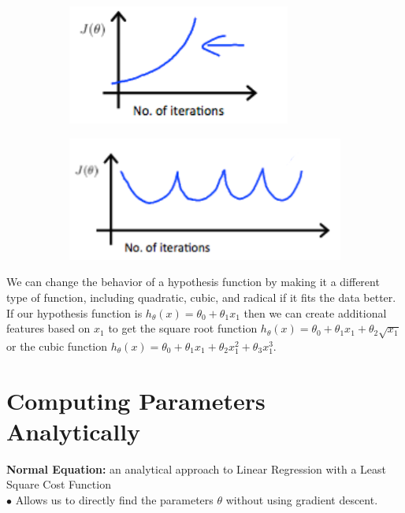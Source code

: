 \documentclass{article}
\begin{document}
        \begin{figure}[hbt!]
            \centering
            \begin{subfigure}[b]{.45\linewidth}
                \includegraphics[scale=1]{Resources/Gradient_Descent_Debug}
            \end{subfigure}
            \begin{subfigure}[b]{.45\linewidth}
                \includegraphics[scale=0.8]{Resources/Gradient_Descent_Debug2}
            \end{subfigure}
        \end{figure}

        \noindent We can change the behavior of a hypothesis function by making it a different type of
        function, including quadratic, cubic, and radical if it fits the data better. If our hypothesis
        function is $h_\theta (x)=\theta_0+\theta_1 x_1$ then we can create additional features based on $x_1$
        to get the square root function $h_\theta(x)=\theta_0 +\theta_1 x_1+\theta_2\sqrt{x_1}$ or the cubic
        function $h_\theta(x)=\theta_0 + \theta_1 x_1 + \theta_2 x_1^2 + \theta_3 x_1^3$.



    \pagebreak
    \section{Computing Parameters Analytically}
        \textbf{Normal Equation:} an analytical approach to Linear Regression with a Least Square Cost Function \\
        $\bullet$ Allows us to directly find the parameters $\theta$ without using gradient descent. \\
\end{document}

